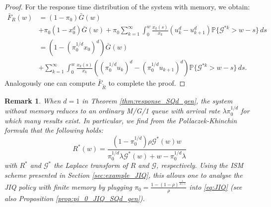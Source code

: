 \documentclass[12pt]{report}
\newtheorem{remark}{Remark}
\begin{document}
\begin{proof}
For the response time distribution of the system with memory, we obtain:
\begin{align*}
\bar F_R(w)
&= (1-\pi_0) \bar G(w)\\
& + \pi_0 (1-x_0^d) \bar G(w)+ \pi_0 \sum_{k=1}^\infty \int_0^w \frac{x_k(s)}{x_k} (u_k^d - u_{k+1}^d) \mathbb{P}\{ \mathcal{G}^{*k}  > w-s \} \, ds\\
&= (1- (\pi_0^{1/d} x_0)^d) \bar G(w)\\
& + \sum_{k=1}^\infty \int_0^w \frac{x_k(s)}{x_k} ((\pi_0^{1/d} u_k)^d-(\pi_0^{1/d} u_{k+1})^d) \mathbb{P}\{\mathcal{G}^{*k} > w-s \} \, ds.
\end{align*}
Analogously one can compute $\bar F_{\tilde R}$ to complete the proof.
\end{proof}
\begin{remark}
When $d=1$ in Theorem \ref{thm:response_SQd_gen}, the system without memory reduces to an 
ordinary M/G/1 queue with arrival rate $\lambda \pi_0^{1/d}$ for which many results exist. 
In particular, we find from the Pollaczek-Khinchin formula that the following holds:
\begin{equation}\label{eq:JIQ}
 R^*(w) = \frac{(1-\pi_0^{1/d})\rho \mathcal{G}^*(w)w}{\pi_0^{1/d}\lambda \mathcal{G}^*(w)+w- \pi_0^{1/d} \lambda} 
\end{equation}
with $R^*$  and $\mathcal{G}^*$ the Laplace transform of $R$ and $\mathcal{G}$,
respectively. Using the ISM scheme presented in Section \ref{sec:example_JIQ}, 
this allows one to analyse the JIQ policy with finite memory by plugging $\pi_0=\frac{1-(1-\rho)^{\frac{1}{A+1}}}{\rho}$ into \eqref{eq:JIQ} (see also Proposition \ref{prop:pi_0_JIQ_SQd_gen}).
\end{remark}
\end{document}
